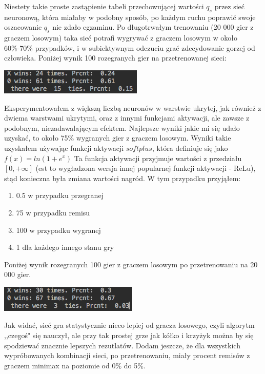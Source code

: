 \documentclass[licencjacka]{pracamgr}
\begin{document}
Niestety takie proste zastąpienie tabeli przechowującej wartości $q_{s}$ przez sieć neuronową, która miałaby w podobny sposób, po każdym ruchu poprawić swoje oszacowanie $q_{s}$ nie zdało egzaminu. Po długotrwałym trenowaniu (20 000 gier z graczem losowym) taka sieć potrafi wygrywać z graczem losowym w około 60\%-70\% przypadków, i w subiektywnym odczuciu grać zdecydowanie gorzej od człowieka.  Poniżej wynik 100 rozegranych gier na przetrenowanej sieci:

\begin{flushleft}
	\includegraphics [scale=0.7]{nn_I_tanh.png}
\end{flushleft}

Eksperymentowałem  z większą liczbą neuronów w warstwie ukrytej, jak również z dwiema warstwami ukrytymi, oraz z innymi funkcjami aktywacji, ale zawsze z podobnym, niezadawalającym efektem. Najlepsze wyniki jakie mi się udało uzyskać, to około 75\% wygranych gier z graczem losowym. Wyniki takie uzyskałem używając funkcji aktywacji $softplus$, która definiuje się jako  $f(x) = ln(1+e^{x})$ Ta funkcja aktywacji przyjmuje wartości z przedziału $[0,+\infty]$  (est to wygładzona wersja innej popularnej funkcji aktywacji -  ReLu), stąd konieczna była zmiana wartości nagród. W tym przypadku przyjąłem:

\begin{enumerate}
	\item{0.5 w przypadku przegranej}
	\item{75 w przypadku remisu }
	\item{100 w przypadku wygranej}
	\item{1 dla każdego innego stanu gry}
\end{enumerate}

Poniżej wynik rozegranych 100 gier z graczem losowym po przetrenowaniu na 20 000 gier.

\begin{flushleft}
	\includegraphics [scale=0.7]{nn_I_softplus.png}
\end{flushleft}

Jak widać, sieć gra statystycznie nieco lepiej od gracza losowego, czyli algorytm ,,czegoś" się nauczył, ale przy tak prostej grze jak kółko i krzyżyk można by się spodziewać znacznie lepszych rezutlatów. Dodam jeszcze, że dla wszystkich wypróbowanych kombinacji sieci, po przetrenowaniu, miały procent remisów z graczem minimax na poziomie od 0\% do 5\%.
\end{document}
